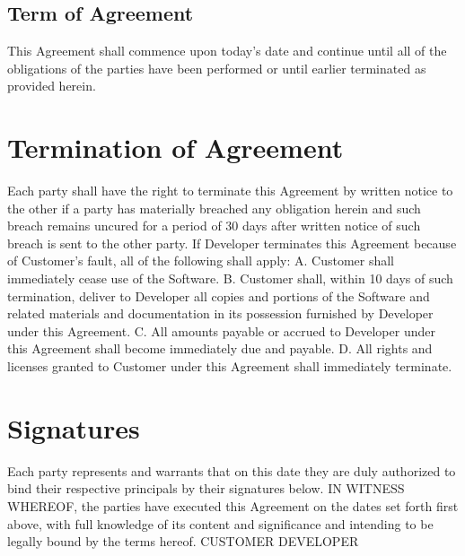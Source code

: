 \documentclass{article}
\begin{document}
\subsection{Term of Agreement}
This Agreement shall commence upon today’s date and continue until all of the obligations of the parties have been performed or until earlier terminated as provided herein.
\section{Termination of Agreement}
Each party shall have the right to terminate this Agreement by written notice to the other if a party has materially breached any obligation herein and such breach remains uncured for a period of 30 days after written notice of such breach is sent to the other party.
If Developer terminates this Agreement because of Customer's fault, all of the following shall apply:
A.	Customer shall immediately cease use of the Software.
B.	Customer shall, within 10 days of such termination, deliver to Developer all copies and portions of the Software and related materials and documentation in its possession furnished by Developer under this Agreement.
C.	All amounts payable or accrued to Developer under this Agreement shall become immediately due and payable.
D.	All rights and licenses granted to Customer under this Agreement shall immediately terminate. 
\section{Signatures}
Each party represents and warrants that on this date they are duly authorized to bind their respective principals by their signatures below.
IN WITNESS WHEREOF, the parties have executed this Agreement on the dates set forth first above, with full knowledge of its content and significance and intending to be legally bound by the terms hereof.
CUSTOMER						DEVELOPER
\end{document}
